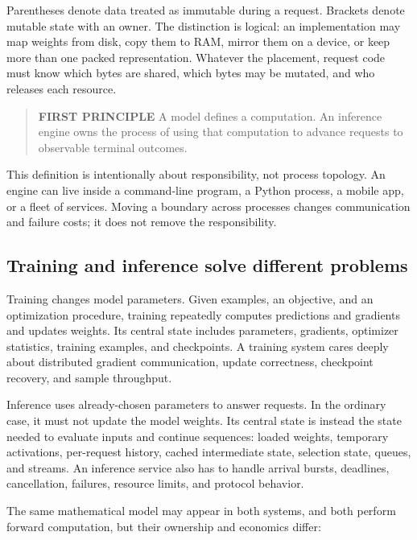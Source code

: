 \documentclass[
  10pt,
]{article}
\begin{document}
Parentheses denote data treated as immutable during a request. Brackets
denote mutable state with an owner. The distinction is logical: an
implementation may map weights from disk, copy them to RAM, mirror them
on a device, or keep more than one packed representation. Whatever the
placement, request code must know which bytes are shared, which bytes
may be mutated, and who releases each resource.

\begin{quote}
\textbf{FIRST PRINCIPLE} A model defines a computation. An inference
engine owns the process of using that computation to advance requests to
observable terminal outcomes.
\end{quote}

This definition is intentionally about responsibility, not process
topology. An engine can live inside a command-line program, a Python
process, a mobile app, or a fleet of services. Moving a boundary across
processes changes communication and failure costs; it does not remove
the responsibility.

\subsection{Training and inference solve different
problems}\label{training-and-inference-solve-different-problems}

Training changes model parameters. Given examples, an objective, and an
optimization procedure, training repeatedly computes predictions and
gradients and updates weights. Its central state includes parameters,
gradients, optimizer statistics, training examples, and checkpoints. A
training system cares deeply about distributed gradient communication,
update correctness, checkpoint recovery, and sample throughput.

Inference uses already-chosen parameters to answer requests. In the
ordinary case, it must not update the model weights. Its central state
is instead the state needed to evaluate inputs and continue sequences:
loaded weights, temporary activations, per-request history, cached
intermediate state, selection state, queues, and streams. An inference
service also has to handle arrival bursts, deadlines, cancellation,
failures, resource limits, and protocol behavior.

The same mathematical model may appear in both systems, and both perform
forward computation, but their ownership and economics differ:
\end{document}
